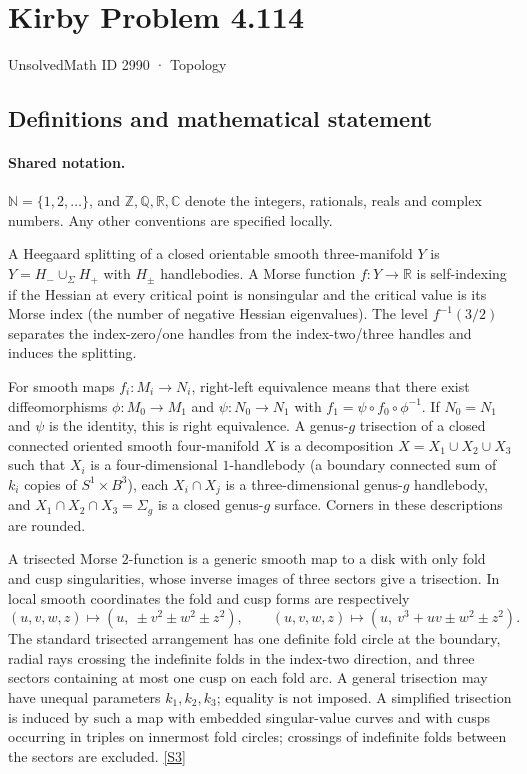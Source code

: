 \documentclass[11pt]{article}
\newcommand{\sref}[2]{\hyperlink{source:#1:#2}{[S#2]}}
\begin{document}
\setcounter{section}{2989}
\section{Kirby Problem 4.114}\label{2990}
{\small\sffamily UnsolvedMath ID 2990 · Topology}
\subsection{Definitions and mathematical statement}

\paragraph{Shared notation.}$\mathbb N=\{1,2,\ldots\}$, and $\mathbb Z,\mathbb Q,\mathbb R,\mathbb C$ denote the integers, rationals, reals and complex numbers. Any other conventions are specified locally.


A Heegaard splitting of a closed orientable smooth three-manifold $Y$ is $Y=H_-\cup_\Sigma H_+$ with $H_\pm$ handlebodies. A Morse function $f:Y\to\mathbb R$ is self-indexing if the Hessian at every critical point is nonsingular and the critical value is its Morse index (the number of negative Hessian eigenvalues). The level $f^{-1}(3/2)$ separates the index-zero/one handles from the index-two/three handles and induces the splitting.

For smooth maps $f_i:M_i\to N_i$, right-left equivalence means that there exist diffeomorphisms $\phi:M_0\to M_1$ and $\psi:N_0\to N_1$ with $f_1=\psi\circ f_0\circ\phi^{-1}$. If $N_0=N_1$ and $\psi$ is the identity, this is right equivalence.
A genus-$g$ trisection of a closed connected oriented smooth four-manifold $X$ is a decomposition $X=X_1\cup X_2\cup X_3$ such that $X_i$ is a four-dimensional $1$-handlebody (a boundary connected sum of $k_i$ copies of $S^1\times B^3$), each $X_i\cap X_j$ is a three-dimensional genus-$g$ handlebody, and $X_1\cap X_2\cap X_3=\Sigma_g$ is a closed genus-$g$ surface. Corners in these descriptions are rounded.

A trisected Morse $2$-function is a generic smooth map to a disk with only fold and cusp singularities, whose inverse images of three sectors give a trisection. In local smooth coordinates the fold and cusp forms are respectively
\[
 (u,v,w,z)\mapsto(u,\ \pm v^2\pm w^2\pm z^2),\qquad
 (u,v,w,z)\mapsto(u,\ v^3+uv\pm w^2\pm z^2).
\]
The standard trisected arrangement has one definite fold circle at the boundary, radial rays crossing the indefinite folds in the index-two direction, and three sectors containing at most one cusp on each fold arc. A general trisection may have unequal parameters $k_1,k_2,k_3$; equality is not imposed. A simplified trisection is induced by such a map with embedded singular-value curves and with cusps occurring in triples on innermost fold circles; crossings of indefinite folds between the sectors are excluded. \sref{2990}{3}
\end{document}
